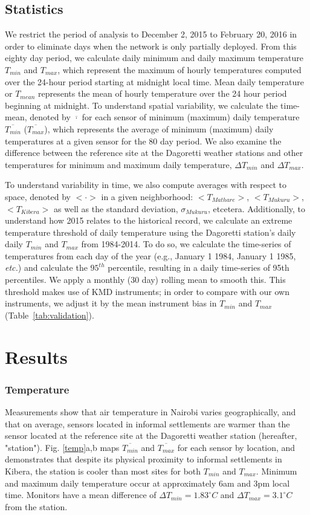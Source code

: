 \subsection{Statistics}
We restrict the period of analysis to December 2, 2015 to February 20, 2016 in order to eliminate days when the network is only partially deployed. From this eighty day period, we calculate daily minimum and daily maximum temperature $T_{min}$ and $T_{max}$, which represent the maximum of hourly temperatures computed over the 24-hour period starting at midnight local time. Mean daily temperature or $T_{mean}$ represents the mean of hourly temperature over the 24 hour period beginning at midnight. To understand spatial variability, we calculate the time-mean, denoted by $\overline{\cdot}$ for each sensor of minimum (maximum) daily temperature $\overline{T_{min}}$ ($\overline{T_{max}}$), which represents the average of minimum (maximum) daily temperatures at a given sensor for the 80 day period. We also examine the difference between the reference site at the Dagoretti weather stations and other temperatures for minimum and maximum daily temperature, $\Delta T_{min}$ and $\Delta T_{max}$. 

To understand variability in time, we also compute averages with respect to space, denoted by $<\cdot >$ in a given neighborhood: $<T_{Mathare}>$, $<T_{Mukuru}>$, $<T_{Kibera}>$ as well as the standard deviation, $\sigma_{Mukuru}$, etcetera. Additionally, to understand how 2015 relates to the historical record, we calculate an extreme temperature threshold of daily temperature using the Dagoretti station's daily  daily $T_{min}$ and $T_{max}$ from 1984-2014. 
To do so, we calculate the time-series of temperatures from each day of the year (e.g., January 1 1984, January 1 1985, \textit{etc.}) and calculate the $95^{th}$ percentile, resulting in a daily time-series of 95th percentiles. We apply a monthly (30 day) rolling mean to smooth this. This threshold makes use of KMD instruments; in order to compare with our own instruments, we adjust it by the mean instrument bias in $T_{min}$ and $T_{max}$ (Table~\ref{tab:validation}).  

\section{Results} 
\subsubsection{Temperature}
Measurements show that air temperature in Nairobi varies geographically, and that on average, sensors located in informal settlements are warmer than the sensor located at the reference site at the Dagoretti weather station (hereafter, "station"). Fig. \ref{temp}a,b maps $\overline{T_{min}}$ and $\overline{T_{max}}$ for each sensor by location, and demonstrates that despite its physical proximity to informal settlements in Kibera, the station is cooler than most sites for both $T_{min}$ and $T_{max}$. Minimum and maximum daily temperature occur at approximately 6am and 3pm local time.
Monitors have a mean difference of $\Delta T_{min} = 1.83^\circ C$ and $ \Delta T_{max} = 3.1^\circ C$ from the station. 

